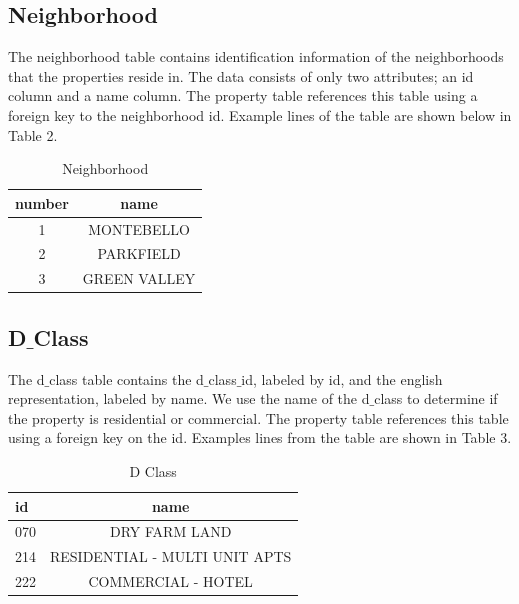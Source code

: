 \documentclass[]{article}
\begin{document}
\subsection{Neighborhood}
The neighborhood table contains identification information of the neighborhoods that the properties reside in.  The data consists of only two attributes; an id column and a name column. The property table references this table using a foreign key to the neighborhood id. Example lines of the table are shown below in Table 2.
 
 
 \begin{table}[h!]
 	\begin{center}
 		\caption{Neighborhood}
 		\label{tab:table2}
 		\begin{tabular}{c|c}
 			\textbf{number} & \textbf{name}\\
 			\hline
 			1 & MONTEBELLO\\
 			2 & PARKFIELD\\
 			3 & GREEN VALLEY\\
 		\end{tabular}
 	\end{center}
 \end{table}

\subsection{D$\_$Class} 
The d$\_$class table contains the d$\_$class$\_$id, labeled by id, and the english representation, labeled by name. We use the name of the d$\_$class to determine if the property is residential or commercial. The property table references this table using a foreign key on the id. Examples lines from the table are shown in Table 3.

\begin{table}[h!]
	\begin{center}
		\caption{D Class}
		\label{tab:table3}
		\begin{tabular}{l|c} %
			\textbf{id} & \textbf{name}\\
			\hline
			070 & DRY FARM LAND\\
			214 & RESIDENTIAL - MULTI UNIT APTS \\
			222 & COMMERCIAL - HOTEL\\
		\end{tabular}
	\end{center}
\end{table}
\end{document}
